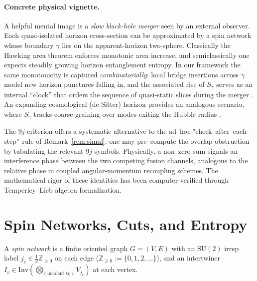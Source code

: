 \documentclass[11pt]{article}
\newcommand{\SU}{\mathrm{SU}(2)}
\newcommand{\Inv}{\mathrm{Inv}}
\newcommand{\Cut}{\gamma}
\newcommand{\NN}{\mathbb{Z}_{\ge 0}}
\begin{document}
\paragraph{Concrete physical vignette.}

A helpful mental image is a \emph{slow black-hole merger} seen
by an external observer. Each quasi-isolated horizon cross-section can be approximated by a
spin network whose boundary $\Cut$ lies on the apparent-horizon two-sphere.
Classically the Hawking area theorem enforces monotonic area increase, and
semiclassically one expects steadily growing horizon entanglement entropy.
In our framework the same monotonicity is captured \emph{combinatorially}:
local bridge insertions across $\Cut$ model new horizon punctures falling
in, and the associated rise of $S_{\Cut}$ serves as an internal “clock” that
orders the sequence of quasi-static slices during the merger
\cite{AshtekarKrishnan2004,BoothFairhurst2007}. An expanding cosmological
(de Sitter) horizon provides an analogous scenario, where $S_{\Cut}$
tracks coarse-graining over modes exiting the Hubble radius
\cite{GibbonsHawking1977}.


\begin{remark}
  The $9j$ criterion offers a systematic alternative to the ad~hoc
  "check–after–each–step'' rule of Remark~\ref{rem:simul}:
  one may pre–compute the overlap obstruction by tabulating the relevant
  $9j$ symbols.  Physically, a non–zero sum signals an interference phase
  between the two competing fusion channels, analogous to the relative
  phase in coupled angular‐momentum recoupling schemes. The mathematical rigor of these identities has been computer-verified through Temperley--Lieb algebra formalization.
\end{remark}


\section{Spin Networks, Cuts, and Entropy}

\begin{definition}\label{def:spinnet}
  A \emph{spin network} is a finite oriented graph $G=(V,E)$ with an $\SU$ irrep label $j_e\in\tfrac{1}{2}\NN$ on each edge ($\NN:=\{0,1,2,\dots\}$), and an intertwiner $I_v\in\Inv\left(\bigotimes_{\text{$e$ incident to }v}V_{j_e}\right)$ at each vertex.
\end{definition}
\end{document}
